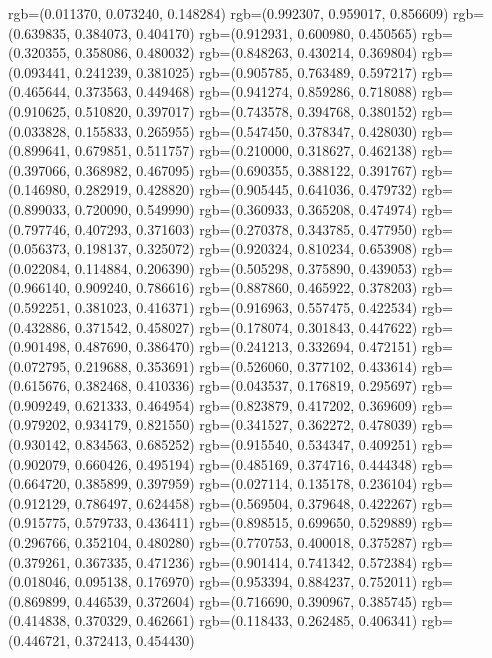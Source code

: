{{{					rgb=(0.011370, 0.073240, 0.148284)
					rgb=(0.992307, 0.959017, 0.856609)
					rgb=(0.639835, 0.384073, 0.404170)
					rgb=(0.912931, 0.600980, 0.450565)
					rgb=(0.320355, 0.358086, 0.480032)
					rgb=(0.848263, 0.430214, 0.369804)
					rgb=(0.093441, 0.241239, 0.381025)
					rgb=(0.905785, 0.763489, 0.597217)
					rgb=(0.465644, 0.373563, 0.449468)
					rgb=(0.941274, 0.859286, 0.718088)
					rgb=(0.910625, 0.510820, 0.397017)
					rgb=(0.743578, 0.394768, 0.380152)
					rgb=(0.033828, 0.155833, 0.265955)
					rgb=(0.547450, 0.378347, 0.428030)
					rgb=(0.899641, 0.679851, 0.511757)
					rgb=(0.210000, 0.318627, 0.462138)
					rgb=(0.397066, 0.368982, 0.467095)
					rgb=(0.690355, 0.388122, 0.391767)
					rgb=(0.146980, 0.282919, 0.428820)
					rgb=(0.905445, 0.641036, 0.479732)
					rgb=(0.899033, 0.720090, 0.549990)
					rgb=(0.360933, 0.365208, 0.474974)
					rgb=(0.797746, 0.407293, 0.371603)
					rgb=(0.270378, 0.343785, 0.477950)
					rgb=(0.056373, 0.198137, 0.325072)
					rgb=(0.920324, 0.810234, 0.653908)
					rgb=(0.022084, 0.114884, 0.206390)
					rgb=(0.505298, 0.375890, 0.439053)
					rgb=(0.966140, 0.909240, 0.786616)
					rgb=(0.887860, 0.465922, 0.378203)
					rgb=(0.592251, 0.381023, 0.416371)
					rgb=(0.916963, 0.557475, 0.422534)
					rgb=(0.432886, 0.371542, 0.458027)
					rgb=(0.178074, 0.301843, 0.447622)
					rgb=(0.901498, 0.487690, 0.386470)
					rgb=(0.241213, 0.332694, 0.472151)
					rgb=(0.072795, 0.219688, 0.353691)
					rgb=(0.526060, 0.377102, 0.433614)
					rgb=(0.615676, 0.382468, 0.410336)
					rgb=(0.043537, 0.176819, 0.295697)
					rgb=(0.909249, 0.621333, 0.464954)
					rgb=(0.823879, 0.417202, 0.369609)
					rgb=(0.979202, 0.934179, 0.821550)
					rgb=(0.341527, 0.362272, 0.478039)
					rgb=(0.930142, 0.834563, 0.685252)
					rgb=(0.915540, 0.534347, 0.409251)
					rgb=(0.902079, 0.660426, 0.495194)
					rgb=(0.485169, 0.374716, 0.444348)
					rgb=(0.664720, 0.385899, 0.397959)
					rgb=(0.027114, 0.135178, 0.236104)
					rgb=(0.912129, 0.786497, 0.624458)
					rgb=(0.569504, 0.379648, 0.422267)
					rgb=(0.915775, 0.579733, 0.436411)
					rgb=(0.898515, 0.699650, 0.529889)
					rgb=(0.296766, 0.352104, 0.480280)
					rgb=(0.770753, 0.400018, 0.375287)
					rgb=(0.379261, 0.367335, 0.471236)
					rgb=(0.901414, 0.741342, 0.572384)
					rgb=(0.018046, 0.095138, 0.176970)
					rgb=(0.953394, 0.884237, 0.752011)
					rgb=(0.869899, 0.446539, 0.372604)
					rgb=(0.716690, 0.390967, 0.385745)
					rgb=(0.414838, 0.370329, 0.462661)
					rgb=(0.118433, 0.262485, 0.406341)
					rgb=(0.446721, 0.372413, 0.454430)
}}}
